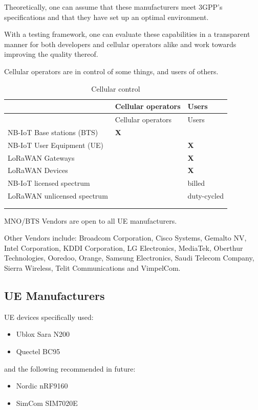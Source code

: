 \documentclass[]{article}
\providecommand{\tightlist}{%
  \setlength{\itemsep}{0pt}\setlength{\parskip}{0pt}}
\begin{document}
Theoretically, one can assume that these manufacturers meet 3GPP's
specifications and that they have set up an optimal environment.

With a testing framework, one can evaluate these capabilities in a
transparent manner for both developers and cellular operators alike and
work towards improving the quality thereof.

Cellular operators are in control of some things, and users of others.

\begin{longtable}[]{@{}lll@{}}
\caption{Cellular control \label{tbl:cellular_control}}\tabularnewline
\toprule
& Cellular operators & Users\tabularnewline
\midrule
\endfirsthead
\toprule
& Cellular operators & Users\tabularnewline
\midrule
\endhead
NB-IoT Base stations (BTS) & \textbf{X} &\tabularnewline
NB-IoT User Equipment (UE) & & \textbf{X}\tabularnewline
LoRaWAN Gateways & & \textbf{X}\tabularnewline
LoRaWAN Devices & & \textbf{X}\tabularnewline
NB-IoT licensed spectrum & & billed\tabularnewline
LoRaWAN unlicensed spectrum & & duty-cycled\tabularnewline
& &\tabularnewline
& &\tabularnewline
\bottomrule
\end{longtable}

MNO/BTS Vendors are open to all UE manufacturers.

Other Vendors include: Broadcom Corporation, Cisco Systems, Gemalto NV,
Intel Corporation, KDDI Corporation, LG Electronics, MediaTek, Oberthur
Technologies, Ooredoo, Orange, Samsung Electronics, Saudi Telecom
Company, Sierra Wireless, Telit Communications and VimpelCom.

\hypertarget{ue-manufacturers}{%
\subsection{UE Manufacturers}\label{ue-manufacturers}}

UE devices specifically used:

\begin{itemize}
\tightlist
\item
  Ublox Sara N200
\item
  Quectel BC95
\end{itemize}

and the following recommended in future:

\begin{itemize}
\tightlist
\item
  Nordic nRF9160
\item
  SimCom SIM7020E
\end{itemize}
\end{document}
